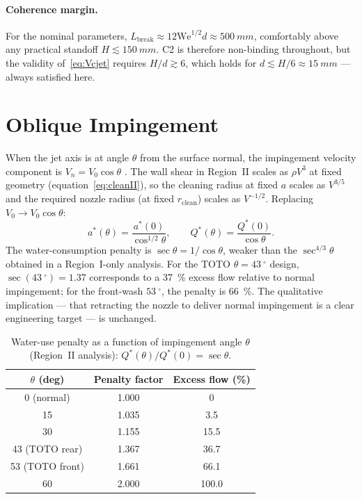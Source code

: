 \documentclass[10pt,letterpaper]{article}
\newcommand{\We}{\mathrm{We}}
\begin{document}
\paragraph{Coherence margin.}
For the nominal parameters, $L_\mathrm{break} \approx 12\We^{1/2}d \approx
500~mm$, comfortably above any practical standoff $H \lesssim
150~mm$. C2 is therefore non-binding throughout, but the validity
of~\eqref{eq:Vcjet} requires $H/d \gtrsim 6$, which holds for
$d \lesssim H/6 \approx 15~mm$ --- always satisfied here.

\section{Oblique Impingement}
\label{sec:oblique}

When the jet axis is at angle $\theta$ from the surface normal, the
impingement velocity component is $V_n = V_0 \cos\theta$
\citep{BeitelmalEtAl2000}. The wall
shear in Region~II scales as $\rho V^3$ at fixed geometry
(equation~\eqref{eq:cleanII}), so the cleaning radius at fixed $a$
scales as $V^{3/5}$ and the required nozzle radius (at fixed
$r_\mathrm{clean}$) scales as $V^{-1/2}$. Replacing $V_0 \to V_0\cos\theta$:
\begin{equation}
  a^*(\theta) = \frac{a^*(0)}{\cos^{1/2}\theta},
  \qquad
  Q^*(\theta) = \frac{Q^*(0)}{\cos\theta}.
  \label{eq:obliqueII}
\end{equation}
The water-consumption penalty is $\sec\theta = 1/\cos\theta$, weaker than
the $\sec^{4/3}\theta$ obtained in a Region~I-only analysis. For the
TOTO $\theta = 43~^\circ $ design,
$\sec(43~^\circ ) = 1.37$ corresponds to a 37~\%
excess flow relative to normal impingement; for the front-wash
$53~^\circ $, the penalty is 66~\%. The qualitative
implication --- that retracting the nozzle to deliver normal
impingement is a clear engineering target --- is unchanged.

\begin{table}[h]
\centering
\caption{Water-use penalty as a function of impingement angle $\theta$
(Region~II analysis): $Q^*(\theta)/Q^*(0) = \sec\theta$.}
\label{tab:oblique}
\begin{tabular}{ccc}
\toprule
$\theta$ (deg) & Penalty factor & Excess flow (\%) \\
\midrule
0 (normal)  & 1.000 & 0 \\
15          & 1.035 & 3.5 \\
30          & 1.155 & 15.5 \\
43 (TOTO rear)  & 1.367 & 36.7 \\
53 (TOTO front) & 1.661 & 66.1 \\
60          & 2.000 & 100.0 \\
\bottomrule
\end{tabular}
\end{table}
\end{document}
